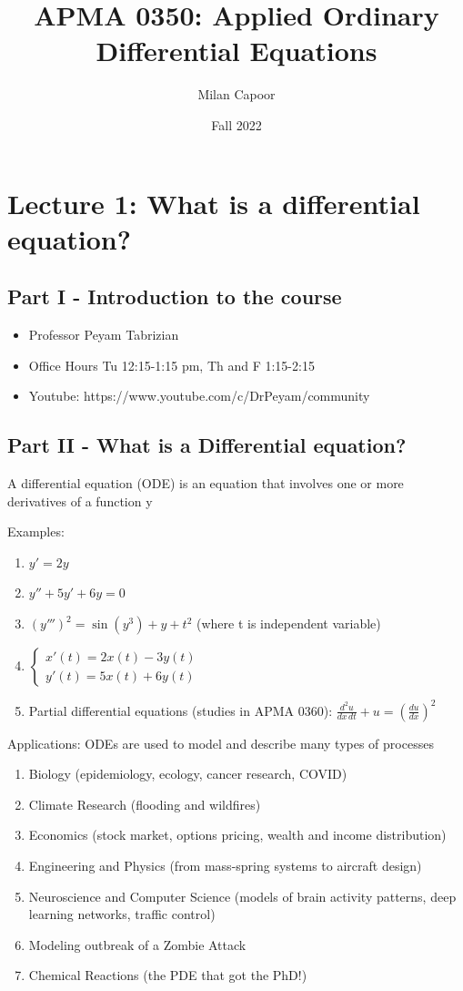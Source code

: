 \documentclass[12pt]{article}
\title{APMA 0350: Applied Ordinary Differential Equations}
\author{Milan Capoor}
\date{Fall 2022}
\begin{document}
\maketitle
\section{Lecture 1: What is a differential equation?}
\subsection*{Part I - Introduction to the course}
\begin{itemize}
    \item Professor Peyam Tabrizian 
    \item Office Hours Tu 12:15-1:15 pm, Th and F 1:15-2:15
    \item Youtube: https://www.youtube.com/c/DrPeyam/community
\end{itemize}

\subsection*{Part II - What is a Differential equation?}
A differential equation (ODE) is an equation that involves one or more
derivatives of a function y

Examples:
\begin{enumerate}
    \item $y' =2y$ 
    \item $y'' + 5y' + 6y = 0$
    \item $(y''')^2 = \sin (y^3) + y+ t^2$ (where t is independent variable)
    \item $\begin{cases}
        x'(t) = 2x(t) - 3y(t)\\
        y'(t) = 5x(t) + 6y(t)
    \end{cases}$
    \item Partial differential equations (studies in APMA 0360): $\frac{d^2 u}{dx\, dt} + u = \left(\frac{du}{dx}\right)^2$
\end{enumerate}

Applications:
ODEs are used to model and describe many types of processes
\begin{enumerate}
    \item Biology (epidemiology, ecology, cancer research, COVID)
    \item Climate Research (flooding and wildfires)
    \item Economics (stock market, options pricing, wealth and income
    distribution)
    \item Engineering and Physics (from mass-spring systems to aircraft
    design)
    \item Neuroscience and Computer Science (models of brain activity
    patterns, deep learning networks, traffic control)
    \item Modeling outbreak of a Zombie Attack
    \item Chemical Reactions (the PDE that got the PhD!)
\end{enumerate}
\end{document}
